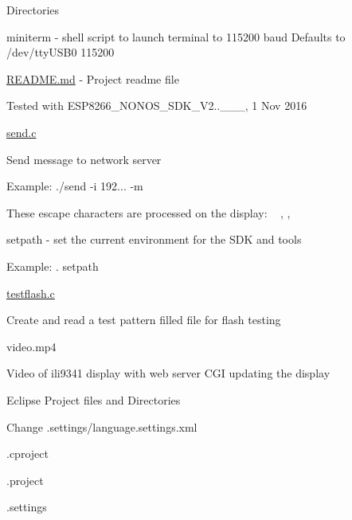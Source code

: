 \begin{DoxyParagraph}{Directories}
\begin{DoxyItemize}
\begin{DoxyItemize}
\item miniterm -\/ shell script to launch terminal to 115200 baud Defaults to /dev/tty\+U\+S\+B0 115200
\item \hyperlink{README_8md}{R\+E\+A\+D\+M\+E.\+md} -\/ Project readme file
\begin{DoxyItemize}
\item Tested with E\+S\+P8266\+\_\+\+N\+O\+N\+O\+S\+\_\+\+S\+D\+K\+\_\+\+V2..\+\_\+\_\+\_, 1 Nov 2016
\end{DoxyItemize}
\item \hyperlink{send_8c}{send.\+c}
\begin{DoxyItemize}
\item Send message to network server
\item Example\+: ./send -\/i 192... -\/m \textquotesingle{}\textquotesingle{}
\begin{DoxyItemize}
\item These escape characters are processed on the display\+: ~\newline
, , 
\end{DoxyItemize}
\end{DoxyItemize}
\item setpath -\/ set the current environment for the S\+DK and tools
\begin{DoxyItemize}
\item Example\+: . setpath
\end{DoxyItemize}
\item \hyperlink{testflash_8c}{testflash.\+c}
\begin{DoxyItemize}
\item Create and read a test pattern filled file for flash testing
\end{DoxyItemize}
\item video.\+mp4
\begin{DoxyItemize}
\item Video of ili9341 display with web server C\+GI updating the display
\end{DoxyItemize}
\end{DoxyItemize}
\item Eclipse Project files and Directories
\begin{DoxyItemize}
\item Change .settings/language.\+settings.\+xml
\item .cproject
\item .project
\item .settings
\begin{DoxyItemize}

\end{DoxyItemize}
\end{DoxyItemize}
\end{DoxyItemize}
\end{DoxyParagraph}
